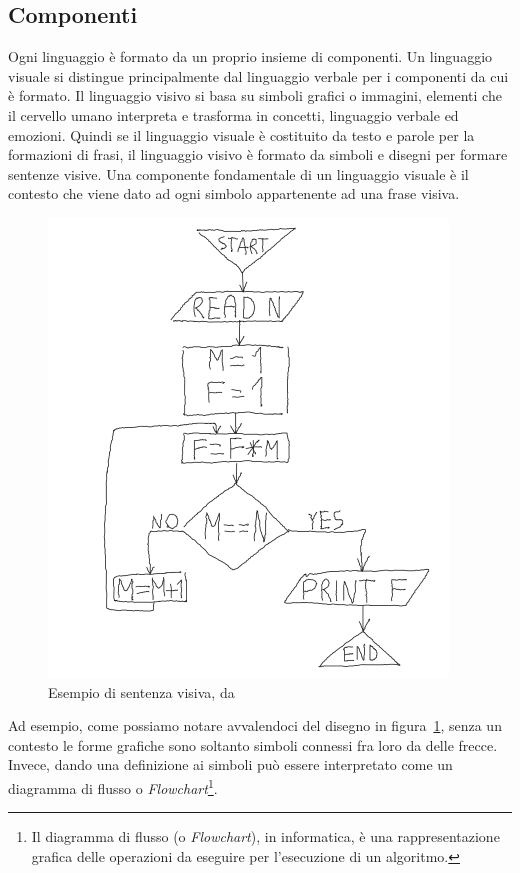             \subsection{Componenti}
                Ogni linguaggio è formato da un proprio insieme di componenti. Un linguaggio visuale si distingue principalmente dal linguaggio verbale per i componenti da cui è formato. Il linguaggio visivo si basa su simboli grafici o immagini, elementi che il cervello umano interpreta e trasforma in concetti, linguaggio verbale ed emozioni. Quindi se il linguaggio visuale è costituito da testo e parole per la formazioni di frasi, il linguaggio visivo è formato da simboli e disegni per formare sentenze visive.
                Una componente fondamentale di un linguaggio visuale è il contesto che viene dato ad ogni simbolo appartenente ad una frase visiva.
                \begin{figure}[htbp]
                    \centering
                    \includegraphics[scale=0.6]{Figure/diagram.PNG}
                    \caption{Esempio di sentenza visiva, da~\cite{localcontext_recognition}}
                    \label{fig:diagram}
                \end{figure}
                Ad esempio, come possiamo notare avvalendoci del disegno in figura~\ref{fig:diagram}, senza un contesto le forme grafiche sono soltanto simboli connessi fra loro da delle frecce. Invece, dando una definizione ai simboli può essere interpretato come un diagramma di flusso o \textit{Flowchart}\footnote{Il diagramma di flusso (o \textit{Flowchart}), in informatica, è una rappresentazione grafica delle operazioni da eseguire per l'esecuzione di un algoritmo.}.

